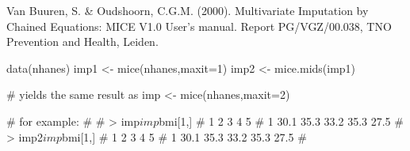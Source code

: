 \begin{References}\relax
Van Buuren, S. \& Oudshoorn, C.G.M. (2000). Multivariate Imputation by Chained Equations: 
MICE V1.0 User's manual. Report PG/VGZ/00.038, TNO Prevention and Health, Leiden.
\end{References}
\begin{SeeAlso}\relax
\end{SeeAlso}
\begin{Examples}
\begin{ExampleCode}
data(nhanes)
imp1 <- mice(nhanes,maxit=1)
imp2 <- mice.mids(imp1)

# yields the same result as
imp <- mice(nhanes,maxit=2)

# for example:
# 
# > imp$imp$bmi[1,]
#      1    2    3    4    5 
# 1 30.1 35.3 33.2 35.3 27.5
# > imp2$imp$bmi[1,]
#      1    2    3    4    5 
# 1 30.1 35.3 33.2 35.3 27.5
# 
\end{ExampleCode}
\end{Examples}

